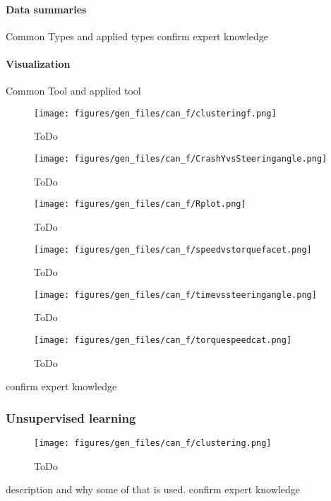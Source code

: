 		\paragraph{Data summaries}
		Common Types and applied types
		confirm expert knowledge
		\paragraph{Visualization}
		Common Tool and applied tool
		\begin{figure}[!ht]
			\centering
			\texttt{[image: figures/gen\_files/can\_f/clusteringf.png]}
			\caption{ToDo} 
			\end{figure}
		\begin{figure}[!ht]
			\centering
			\texttt{[image: figures/gen\_files/can\_f/CrashYvsSteeringangle.png]}
			\caption{ToDo} 
			\end{figure}
		\begin{figure}[!ht]
			\centering
			\texttt{[image: figures/gen\_files/can\_f/Rplot.png]}
			\caption{ToDo} 
			\end{figure}		
		\begin{figure}[!ht]
			\centering
			\texttt{[image: figures/gen\_files/can\_f/speedvstorquefacet.png]}
			\caption{ToDo} 
			\end{figure}	
		\begin{figure}[!ht]
			\centering
			\texttt{[image: figures/gen\_files/can\_f/timevssteeringangle.png]}
			\caption{ToDo} 
			\end{figure}	
		\begin{figure}[!ht]
			\centering
			\texttt{[image: figures/gen\_files/can\_f/torquespeedcat.png]}
			\caption{ToDo} 
			\end{figure}		
		confirm expert knowledge
	\subsubsection{Unsupervised learning}
			\begin{figure}[!ht]
			\centering
			\texttt{[image: figures/gen\_files/can\_f/clustering.png]}
			\caption{ToDo} 
			\end{figure}
	description and why some of that is used.
	confirm expert knowledge
